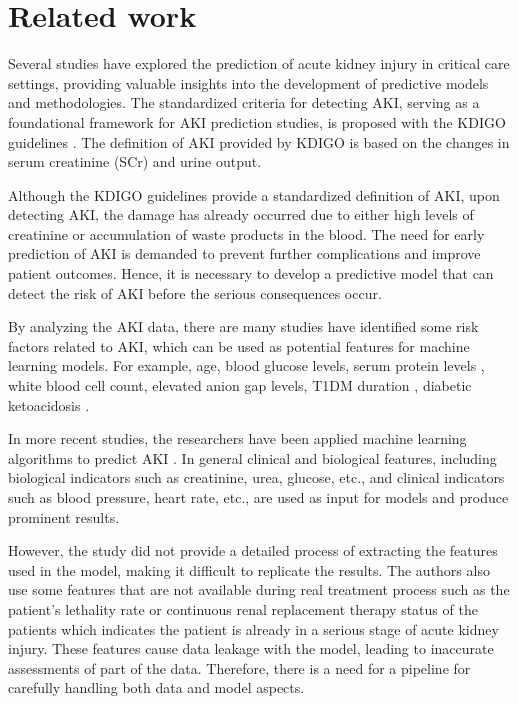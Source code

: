 \documentclass[sn-mathphys-num]{sn-jnl}%
\theoremstyle{thmstyleone}%
\theoremstyle{thmstyletwo}%
\theoremstyle{thmstylethree}%
\begin{document}

\section{Related work}
\label{sec:related_work}

Several studies have explored the prediction of acute kidney injury in critical care settings, providing valuable insights into the development of predictive models and methodologies. The standardized criteria for detecting AKI, serving as a foundational framework for AKI prediction studies, is proposed with the KDIGO guidelines \cite{kdigo-aki-guideline}. The definition of AKI provided by KDIGO is based on the changes in serum creatinine (SCr) and urine output. 

Although the KDIGO guidelines provide a standardized definition of AKI, upon detecting AKI, the damage has already occurred due to either high levels of creatinine or accumulation of waste products in the blood.
The need for early prediction of AKI is demanded to prevent further complications and improve patient outcomes.
Hence, it is necessary to develop a predictive model that can detect the risk of AKI before the serious consequences occur.

By analyzing the AKI data, there are many studies have identified some risk factors related to AKI, which can be used as potential features for machine learning models. For example, age, blood glucose levels, serum protein levels \cite{orban2014incidence}, white blood cell count, elevated anion gap levels, T1DM duration \cite{yang2021acute}, diabetic ketoacidosis \cite{hang2024blood,chen2020incidence, ahmed2022relationship}.

In more recent studies, the researchers have been applied machine learning algorithms to predict AKI \cite{monogram-aki-dka,xgboost-aki-dka}. In general clinical and biological features, including biological indicators such as creatinine, urea, glucose, etc., and clinical indicators such as blood pressure, heart rate, etc., are used as input for models and produce prominent results.

However, the study did not provide a detailed process of extracting the features used in the model, making it difficult to replicate the results.
The authors also use some features that are not available during real treatment process such as the patient's lethality rate or continuous renal replacement therapy status of the patients which indicates the patient is already in a serious stage of acute kidney injury. These features cause data leakage with the model, leading to inaccurate assessments of part of the data. Therefore, there is a need for a pipeline for carefully handling both data and model aspects.
\end{document}
